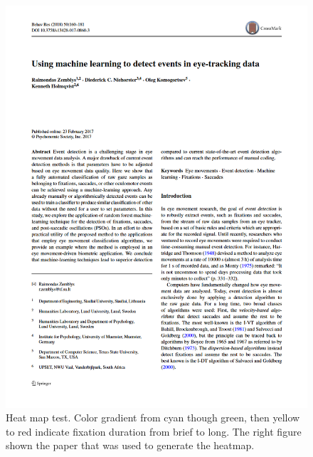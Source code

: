 \begin{figure}
\begin{minipage}{0.5\textwidth}
        \includegraphics[width=\textwidth]{Images/DataQuality/Paper.png}
    \end{minipage}
    \caption{Heat map test. Color gradient from cyan though green, then yellow to red indicate fixation duration from brief to long. The right figure shown the paper that was used to generate the heatmap.}
    \label{fig:res_PaperHeatmap}
\end{figure}

